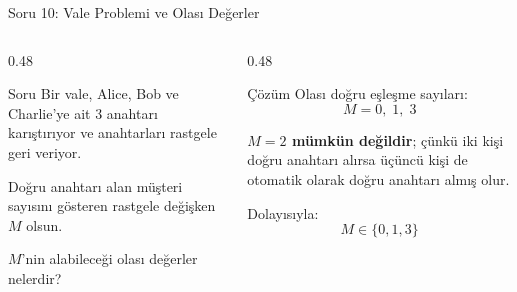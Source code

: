 \documentclass[light]{lutbeamer}
\begin{document}
\begin{frame}{Soru 10: Vale Problemi ve Olası Değerler}
\scriptsize
\begin{columns}[T,onlytextwidth]
    \begin{column}{0.48\textwidth}
        \begin{block}{Soru}
            Bir vale, Alice, Bob ve Charlie'ye ait 3 anahtarı karıştırıyor ve anahtarları rastgele geri veriyor.

            \vspace{0.15cm}
            Doğru anahtarı alan müşteri sayısını gösteren rastgele değişken $M$ olsun.

            \vspace{0.15cm}
            $M$'nin alabileceği olası değerler nelerdir?
        \end{block}
    \end{column}
    \begin{column}{0.48\textwidth}
        \begin{exampleblock}{Çözüm}
            Olası doğru eşleşme sayıları:
            \[
            M=0,\;1,\;3
            \]

            \vspace{0.15cm}
            \textbf{$M=2$ mümkün değildir}; çünkü iki kişi doğru anahtarı alırsa üçüncü kişi de otomatik olarak doğru anahtarı almış olur.

            \vspace{0.15cm}
            Dolayısıyla:
            \[
            M \in \{0,1,3\}
            \]
        \end{exampleblock}
    \end{column}
\end{columns}
\end{frame}
\end{document}
